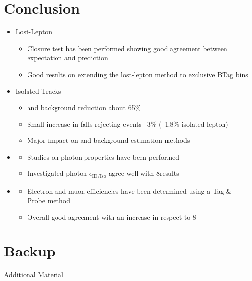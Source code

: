 \documentclass{beamer}
\begin{document}
\section{Conclusion}
\begin{frame}

\begin{itemize}
 \item Lost-Lepton
 \begin{itemize}
  \item Closure test has been performed showing good agreement between expectation and prediction
  \item Good results on extending the lost-lepton method to exclusive BTag bins 
 \end{itemize}
 \item Isolated Tracks
 \begin{itemize}
  \item \ttbar and \wpj background reduction about 65\%
  \item Small increase in falls rejecting events ~3\% (~1.8\% isolated lepton)
  \item Major impact on \ttbar and \wpj background estimation methods
 \end{itemize}
  \item \photonJets
 \begin{itemize}
  \item Studies on photon properties have been performed
  \item Investigated photon $\epsilon_{\text{ID/Iso}}$ agree well with 8\tev results
 \end{itemize}
 \item \Zll
 \begin{itemize}
  \item Electron and muon efficiencies have been determined using a Tag \& Probe method
  \item Overall good agreement with an increase in respect to 8\tev
 \end{itemize}

 
\end{itemize}


\end{frame}
\section{Backup}
\begin{frame}
  \begin{center}
    {\Large Additional Material}
  \end{center}
\end{frame}
\end{document}
